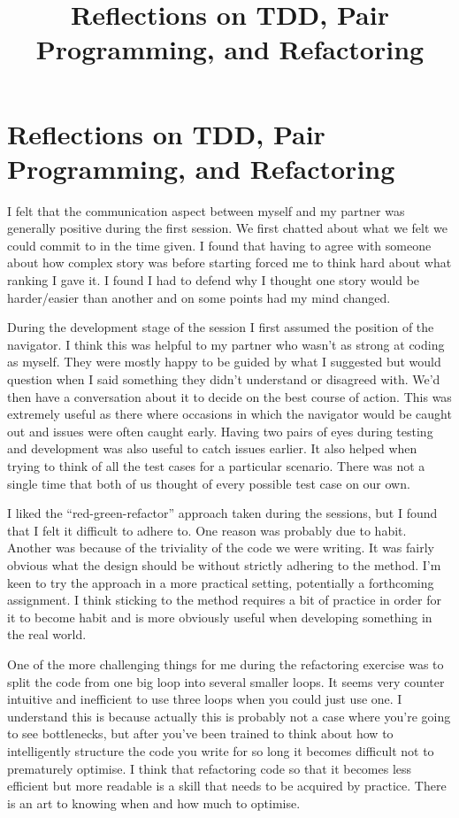 \documentclass[paper=a4, fontsize=11pt]{scrartcl}	%
\title{
	\vspace{-0.5in} 	\usefont{OT1}{bch}{b}{n}
	 Reflections on TDD, Pair Programming, and Refactoring
}
\author{}
\date{}
\numberwithin{equation}{section}															%
\numberwithin{figure}{section}																%
\numberwithin{table}{section}
\begin{document}
\section*{Reflections on TDD, Pair Programming, and Refactoring}
I felt that the communication aspect between myself and my partner was generally positive during the first session. We first chatted about what we felt we could commit to in the time given. I found that having to agree with someone about how complex story was before starting forced me to think hard about what ranking I gave it. I found I had to defend why I thought one story would be harder/easier than another and on some points had my mind changed.

During the development stage of the session I first assumed the position of the navigator. I think this was helpful to my partner who wasn't as strong at coding as myself. They were mostly happy to be guided by what I suggested but would question when I said something they didn't understand or disagreed with. We'd then have a conversation about it to decide on the best course of action. This was extremely useful as there where occasions in which the navigator would be caught out and issues were often caught early. Having two pairs of eyes during testing and development was also useful to catch issues earlier. It also helped when trying to think of all the test cases for a particular scenario. There was not a single time that both of us thought of every possible test case on our own.

I liked the ``red-green-refactor'' approach taken during the sessions, but I found that I felt it difficult to adhere to. One reason was probably due to habit. Another was because of the triviality of the code we were writing. It was fairly obvious what the design should be without strictly adhering to the method. I'm keen to try the approach in a more practical setting, potentially a forthcoming assignment. I think sticking to the method requires a bit of practice in order for it to become habit and is more obviously useful when developing something in the real world.

One of the more challenging things for me during the refactoring exercise was to split the code from one big loop into several smaller loops. It seems very counter intuitive and inefficient to use three loops when you could just use one. I understand this is because actually this is probably not a case where you're going to see bottlenecks, but after you've been trained to think about how to intelligently structure the code you write for so long it becomes difficult not to prematurely optimise. I think that refactoring code so that it becomes less efficient but more readable is a skill that needs to be acquired by practice. There is an art to knowing when and how much to optimise.
\end{document}
